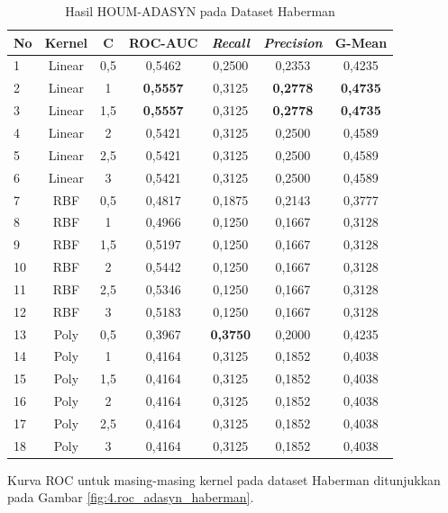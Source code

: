 \begin{table}[H]
\centering
\caption{Hasil HOUM-ADASYN pada Dataset Haberman}
\label{table:4.adasyn_haberman}
\footnotesize
\begin{tabular}{|l|c|c|c|c|c|c|}
\hline
\textbf{No} & \textbf{Kernel} & \textbf{C} & \textbf{ROC-AUC} & \textbf{\textit{Recall}} & \textbf{\textit{Precision}} & \textbf{G-Mean} \\
\hline
1 & Linear & 0,5 & 0,5462 & 0,2500 & 0,2353 & 0,4235 \\
\hline
2 & Linear & 1 & \textbf{0,5557} & 0,3125 & \textbf{0,2778} & \textbf{0,4735} \\
\hline
3 & Linear & 1,5 & \textbf{0,5557} & 0,3125 & \textbf{0,2778} & \textbf{0,4735} \\
\hline
4 & Linear & 2 & 0,5421 & 0,3125 & 0,2500 & 0,4589 \\
\hline
5 & Linear & 2,5 & 0,5421 & 0,3125 & 0,2500 & 0,4589 \\
\hline
6 & Linear & 3 & 0,5421 & 0,3125 & 0,2500 & 0,4589 \\
\hline
7 & RBF & 0,5 & 0,4817 & 0,1875 & 0,2143 & 0,3777 \\
\hline
8 & RBF & 1 & 0,4966 & 0,1250 & 0,1667 & 0,3128 \\
\hline
9 & RBF & 1,5 & 0,5197 & 0,1250 & 0,1667 & 0,3128 \\
\hline
10 & RBF & 2 & 0,5442 & 0,1250 & 0,1667 & 0,3128 \\
\hline
11 & RBF & 2,5 & 0,5346 & 0,1250 & 0,1667 & 0,3128 \\
\hline
12 & RBF & 3 & 0,5183 & 0,1250 & 0,1667 & 0,3128 \\
\hline
13 & Poly & 0,5 & 0,3967 & \textbf{0,3750} & 0,2000 & 0,4235 \\
\hline
14 & Poly & 1 & 0,4164 & 0,3125 & 0,1852 & 0,4038 \\
\hline
15 & Poly & 1,5 & 0,4164 & 0,3125 & 0,1852 & 0,4038 \\
\hline
16 & Poly & 2 & 0,4164 & 0,3125 & 0,1852 & 0,4038 \\
\hline
17 & Poly & 2,5 & 0,4164 & 0,3125 & 0,1852 & 0,4038 \\
\hline
18 & Poly & 3 & 0,4164 & 0,3125 & 0,1852 & 0,4038 \\
\hline
\end{tabular}
\end{table}

Kurva ROC untuk masing-masing kernel pada dataset Haberman ditunjukkan pada Gambar \ref{fig:4.roc_adasyn_haberman}.

